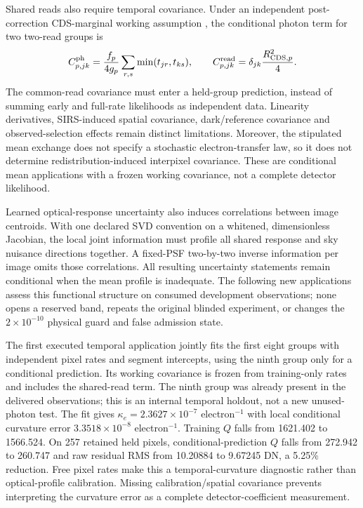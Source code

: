 Shared reads also require temporal covariance. Under an independent post-correction
CDS-marginal working assumption \citep{JWSTReadnoise201}, the conditional photon
term for two two-read groups is
\begin{equation}
 C^{\rm ph}_{p,jk}=\frac{f_p}{4g_p}
       \sum_{r,s}\min(t_{jr},t_{ks}),
 \qquad C^{\rm read}_{p,jk}=
       \delta_{jk}\frac{R_{{\rm CDS},p}^2}{4}.
 \label{eq:he0435-group-noise}
\end{equation}
The common-read covariance must enter a held-group prediction, instead
of summing early and full-rate likelihoods as independent data.
Linearity derivatives, SIRS-induced spatial covariance, dark/reference
covariance and observed-selection effects remain distinct limitations.
Moreover, the stipulated mean exchange does not specify a stochastic
electron-transfer law, so it does not determine redistribution-induced
interpixel covariance. These are conditional mean applications with a
frozen working covariance, not a complete detector likelihood.

Learned optical-response uncertainty also induces correlations between
image centroids. With one declared SVD convention on a whitened,
dimensionless Jacobian, the local joint information must profile all
shared response and sky nuisance directions together. A fixed-PSF
two-by-two inverse information per image omits those correlations.
All resulting uncertainty statements remain conditional when the mean
profile is inadequate. The following new applications assess this
functional structure on consumed development observations; none opens
a reserved band, repeats the original blinded experiment, or changes
the $2\times10^{-10}$ physical guard and false admission state.

The first executed temporal application jointly fits the first eight
groups with independent pixel rates and segment intercepts, using the
ninth group only for a conditional prediction. Its working covariance
is frozen from training-only rates and includes the shared-read term.
The ninth group was already present in the delivered observations;
this is an internal temporal holdout, not a new unused-photon test.
The fit gives $\kappa_e=2.3627\times10^{-7}$ electron$^{-1}$ with local
conditional curvature error $3.3518\times10^{-8}$ electron$^{-1}$.
Training $Q$ falls from 1621.402 to 1566.524. On 257 retained held
pixels, conditional-prediction $Q$ falls from 272.942 to 260.747 and
raw residual RMS from 10.20884 to 9.67245 DN, a 5.25\% reduction.
Free pixel rates make this a temporal-curvature diagnostic rather
than optical-profile calibration. Missing calibration/spatial
covariance prevents interpreting the curvature error as a complete
detector-coefficient measurement.

